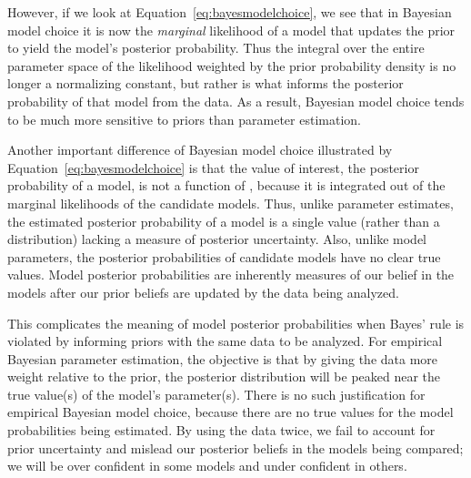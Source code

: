 \documentclass[letterpaper,12pt]{article}
\begin{document}
\begin{linenumbers}

However, if we look at Equation~\ref{eq:bayesmodelchoice}, we see that in
Bayesian model choice it is now the \emph{marginal} likelihood of a model that
updates the prior to yield the model's posterior probability.
Thus the integral over the entire parameter space of the likelihood weighted by
the prior probability density is no longer a normalizing constant, but rather
is what informs the posterior probability of that model from the data.
As a result, Bayesian model choice tends to be much more sensitive to priors
than parameter estimation.

Another important difference of Bayesian model choice illustrated by
Equation~\ref{eq:bayesmodelchoice} is that the value of interest, the
posterior probability of a model, is not a function of \myTheta{}, because
it is integrated out of the marginal likelihoods of the candidate models.
Thus, unlike parameter estimates, the estimated posterior probability of a
model is a single value (rather than a distribution) lacking a measure of
posterior uncertainty.
Also, unlike model parameters, the posterior probabilities of candidate
models have no clear true values.
Model posterior probabilities are inherently measures of our belief in the
models after our prior beliefs are updated by the data being analyzed.

This complicates the meaning of model posterior probabilities when Bayes' rule
is violated by informing priors with the same data to be analyzed.
For empirical Bayesian parameter estimation, the objective is that by giving the
data more weight relative to the prior, the posterior distribution will be
peaked near the true value(s) of the model's parameter(s).
There is no such justification for empirical Bayesian model choice, because
there are no true values for the model probabilities being estimated.
By using the data twice, we fail to account for prior uncertainty and mislead
our posterior beliefs in the models being compared; we will be over confident
in some models and under confident in others.


\end{linenumbers}
\end{document}
